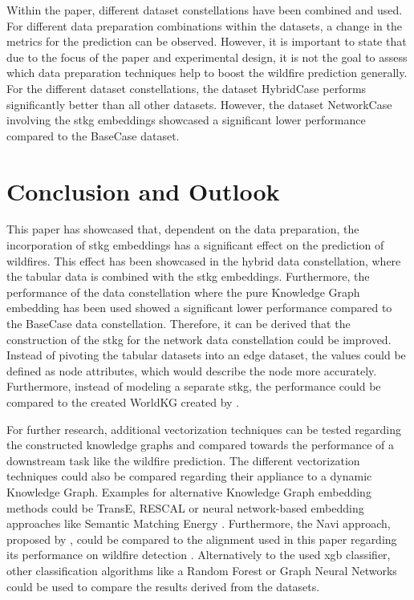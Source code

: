 \documentclass[
]{ceurart}
\begin{document}
Within the paper, different dataset constellations have been combined and used. For different data preparation combinations within the datasets, a change in the metrics for the prediction can be observed. However, it is important to state that due to the focus of the paper and experimental design, it is not the goal to assess which data preparation techniques help to boost the wildfire prediction generally. For the different dataset constellations, the dataset HybridCase performs significantly better than all other datasets. However, the dataset NetworkCase involving the \gls*{stkg} embeddings showcased a significant lower performance compared to the BaseCase dataset.

\section{Conclusion and Outlook}
This paper has showcased that, dependent on the data preparation, the incorporation of \gls*{stkg} embeddings has a significant effect on the prediction of wildfires. This effect has been showcased in the hybrid data constellation, where the tabular data is combined with the \gls*{stkg} embeddings. Furthermore, the performance of the data constellation where the pure Knowledge Graph embedding has been used showed a significant lower performance compared to the BaseCase data constellation. Therefore, it can be derived that the construction of the \gls*{stkg} for the network data constellation could be improved. Instead of pivoting the tabular datasets into an edge dataset, the values could be defined as node attributes, which would describe the node more accurately. Furthermore, instead of modeling a separate \gls*{stkg}, the performance could be compared to the created WorldKG created by \textcite{Tempelmeier.2021}.

For further research, additional vectorization techniques can be tested regarding the constructed knowledge graphs and compared towards the performance of a downstream task like the wildfire prediction. The different vectorization techniques could also be compared regarding their appliance to a dynamic Knowledge Graph. Examples for alternative Knowledge Graph embedding methods could be TransE, RESCAL or neural network-based embedding approaches like Semantic Matching Energy \cite{Wang.2017}. Furthermore, the Navi approach, proposed by \textcite{Krause.2022}, could be compared to the alignment used in this paper regarding its performance on wildfire detection \cite{Krause.2022}. Alternatively to the used \gls*{xgb} classifier, other classification algorithms like a Random Forest or Graph Neural Networks could be used to compare the results derived from the datasets.
\end{document}
